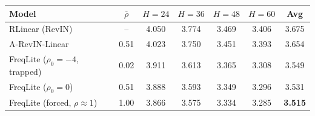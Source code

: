 \begin{tabular}{lcccccc}
\toprule
Model & $\bar\rho$ & $H{=}24$ & $H{=}36$ & $H{=}48$ & $H{=}60$ & Avg \\
\midrule
RLinear (RevIN) & -- & 4.050 & 3.774 & 3.469 & 3.406 & 3.675 \\
A-RevIN-Linear & 0.51 & 4.023 & 3.750 & 3.451 & 3.393 & 3.654 \\
FreqLite ($\rho_0{=}{-}4$, trapped) & 0.02 & 3.911 & 3.613 & 3.365 & 3.308 & 3.549 \\
FreqLite ($\rho_0{=}0$) & 0.51 & 3.888 & 3.593 & 3.349 & 3.296 & 3.531 \\
FreqLite (forced, $\rho{\approx}1$) & 1.00 & 3.866 & 3.575 & 3.334 & 3.285 & \textbf{3.515} \\
\bottomrule
\end{tabular}